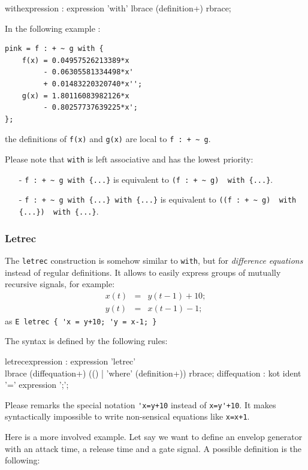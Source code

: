 \begin{rail}
withexpression : expression 'with' lbrace (definition+) rbrace;
\end{rail}


In the following example :
\begin{lstlisting}
pink = f : + ~ g with {
	f(x) = 0.04957526213389*x 
		 - 0.06305581334498*x' 
         + 0.01483220320740*x'';
	g(x) = 1.80116083982126*x 
		 - 0.80257737639225*x';
};
\end{lstlisting}
the definitions of \lstinline'f(x)' and \lstinline'g(x)' are local to \lstinline'f : + ~ g'.

Please note that \lstinline'with' is left associative and has the lowest priority:
\begin{itemize} 
\item[-] \lstinline'f : + ~ g with {...}' is equivalent to \lstinline'(f : + ~ g)  with {...}'. 
\item[-] \lstinline'f : + ~ g with {...} with {...}' is equivalent to \lstinline'((f : + ~ g)  with {...})  with {...}'. 
\end{itemize}

\subsubsection{Letrec} 
The \lstinline'letrec' construction is somehow similar to \lstinline'with', but for   \emph{difference equations} instead of regular definitions. It allows to easily express groups of mutually recursive signals, for example:
\begin{eqnarray*}
x(t)&=&y(t-1)+10;\\
y(t)&=&x(t-1)-1;
\end{eqnarray*}
as \lstinline|E letrec { 'x = y+10; 'y = x-1; }|	

The syntax is defined by the following rules:
\begin{rail}
	letrecexpression : expression 'letrec' \\ lbrace (diffequation+) (() | 'where' (definition+)) rbrace;
diffequation :    kot ident '=' expression ';';  
\end{rail}

Please remarks the special notation \lstinline|'x=y+10| instead of \lstinline|x=y'+10|. It makes syntactically impossible to write non-sensical equations like \lstinline|x=x+1|.

Here is a more involved example. Let say we want to define an envelop generator with an attack time, a release time and a gate signal. A possible definition is the following:

